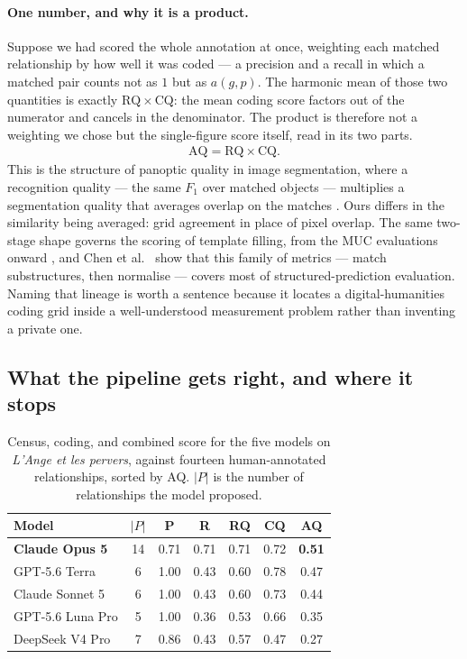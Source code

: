 \paragraph{One number, and why it is a product.} Suppose we had scored the
whole annotation at once, weighting each matched relationship by how well it was
coded --- a precision and a recall in which a matched pair counts not as $1$ but
as $a(g,p)$. The harmonic mean of those two quantities is exactly
$\mathrm{RQ} \times \mathrm{CQ}$: the mean coding score factors out of the
numerator and cancels in the denominator. The product is therefore not a
weighting we chose but the single-figure score itself, read in its two parts.
%
\begin{align}
\mathrm{AQ} = \mathrm{RQ} \times \mathrm{CQ} .
\end{align}
%
This is the structure of panoptic quality in image segmentation, where a
recognition quality --- the same $F_1$ over matched objects --- multiplies a
segmentation quality that averages overlap on the matches
\cite{kirillov2019panoptic}. Ours differs in the similarity being averaged:
grid agreement in place of pixel overlap. The same two-stage shape governs the
scoring of template filling, from the MUC evaluations onward
\cite{chinchor1992muc4,du2021grit}, and Chen et al.\ \cite{chen2023unified} show
that this family of metrics --- match substructures, then normalise --- covers
most of structured-prediction evaluation. Naming that lineage is worth a
sentence because it locates a digital-humanities coding grid inside a
well-understood measurement problem rather than inventing a private one.

\subsection{What the pipeline gets right, and where it stops}

\begin{table}[h]
  \centering
  \small
  \begin{tabular}{lcccccc}
    \toprule
    Model & $|P|$ & P & R & RQ & CQ & AQ \\
    \midrule
    \textbf{Claude Opus 5} & 14 & 0.71 & 0.71 & 0.71 & 0.72 & \textbf{0.51} \\
    GPT-5.6 Terra          &  6 & 1.00 & 0.43 & 0.60 & 0.78 & 0.47 \\
    Claude Sonnet 5        &  6 & 1.00 & 0.43 & 0.60 & 0.73 & 0.44 \\
    GPT-5.6 Luna Pro       &  5 & 1.00 & 0.36 & 0.53 & 0.66 & 0.35 \\
    DeepSeek V4 Pro        &  7 & 0.86 & 0.43 & 0.57 & 0.47 & 0.27 \\
    \bottomrule
  \end{tabular}
  \caption{Census, coding, and combined score for the five models on
  \emph{L'Ange et les pervers}, against fourteen human-annotated relationships,
  sorted by AQ. $|P|$ is the number of relationships the model proposed.}
  \label{tab:model-results}
\end{table}

